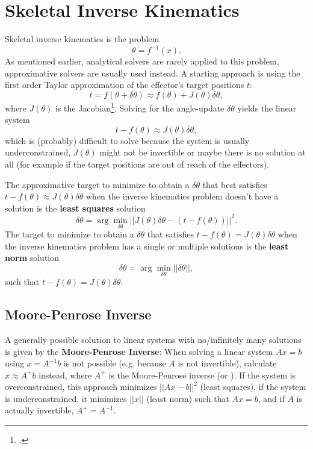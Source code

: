 \section{Skeletal Inverse Kinematics}
\label{sec:skeletalinversekinematics}

Skeletal inverse kinematics is the problem
\[\theta=f^{-1}(x).\]
As mentioned earlier, analytical solvers are rarely applied to this problem,
approximative solvers are usually used instead.
A starting approach is using the first order Taylor approximation of the effector's target positions \(t\):
\[t=f(\theta+\delta\theta)\approx f(\theta)+J(\theta)\delta\theta,\]
where \(J(\theta)\) is the Jacobian\footnote{
  .
}.
Solving for the angle-update \(\delta\theta\) yields the linear system
\[t-f(\theta)\approx J(\theta)\delta\theta,\]
which is (probably) difficult to solve because the system is usually underconstrained, \(J(\theta)\) might not be invertible or maybe there is no solution at all (for example if the target positions are out of reach of the effectors).

The approximative target to minimize to obtain a \(\delta\theta\) that best satisfies \(t-f(\theta)\approx J(\theta)\delta\theta\) when the inverse kinematics problem doesn't have a solution is the \textbf{least squares} solution
\[\delta\theta=\arg\min\limits_{\delta\theta}||J(\theta)\delta\theta-(t-f(\theta))||^2.\]
The target to minimize to obtain a \(\delta\theta\) that satisfies \(t-f(\theta)=J(\theta)\delta\theta\) when the inverse kinematics problem has a single or multiple solutions is the \textbf{least norm} solution
\[\delta\theta=\arg\min\limits_{\delta\theta}||\delta\theta||,\]
such that \(t-f(\theta)=J(\theta)\delta\theta\).

\subsection{Moore-Penrose Inverse}
\label{subsec:moorepenroseinverse}

A generally possible  solution to linear systems with no/infinitely many solutions is given by the \textbf{Moore-Penrose Inverse}:
When solving a linear system \(Ax=b\) using \(x=A^{-1}b\) is not possible (e.g. because \(A\) is not invertible),
calculate \(x\approx A^+b\) instead, where \(A^+\) is the Moore-Penrose inverse (or ).
If the system is overconstrained, this approach minimizes \(||Ax-b||^2\) (least squares),
if the system is underconstrained, it minimizes \(||x||\) (least norm) such that \(Ax=b\),
and if \(A\) is actually invertible, \(A^+=A^{-1}\).

